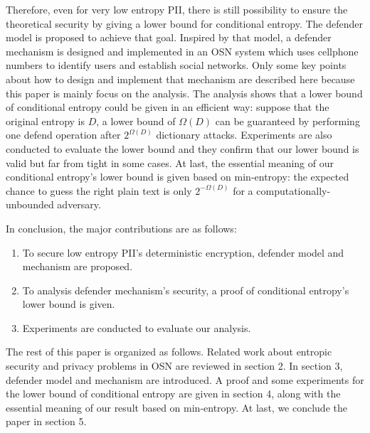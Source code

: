 \documentclass[10pt, conference, compsocconf]{IEEEtran}
\begin{document}
	Therefore, even for very low entropy PII, 
	there is still possibility to ensure the
	theoretical security by giving a lower bound for conditional entropy.
	The defender model is proposed to achieve that goal.
	Inspired by that model, a defender mechanism is designed and implemented
	in an OSN system which uses cellphone numbers
	to identify users and establish social networks.
	Only some key points about how to design and implement that mechanism
	are described here because this paper is mainly focus on the analysis.
	The analysis shows that a lower bound 
	of conditional entropy could be given in an efficient way: suppose that the original entropy
	is $D$, a lower bound of $\Omega(D)$ can be guaranteed
	by performing one defend operation after $2^{\Omega(D)}$ 
	dictionary attacks.
	Experiments are also conducted to evaluate the lower bound and they confirm that
	our lower bound is valid but far from tight in some cases. At last, the essential
	meaning of our conditional entropy's lower bound is given based on min-entropy: 
	the expected chance to guess the right plain text is only $2^{-\Omega(D)}$ for
	a computationally-unbounded adversary.
	
	In conclusion, the major contributions are as follows: 
	\begin{enumerate}
		\item To secure low entropy PII's deterministic encryption, 
		defender model and mechanism are proposed.
		\item To analysis defender mechanism's security,
		a proof of conditional entropy's lower bound
		is given.
		\item Experiments
		are conducted to evaluate our analysis.
	\end{enumerate}
	
	The rest of this paper is organized as follows.
	Related work about entropic security
	and privacy problems in OSN are reviewed in section 2. In
	section 3, defender model and mechanism are introduced. 
	A proof and some experiments for the
	lower bound of conditional entropy are given in section 4, 
	along with the essential
	meaning of our result based on min-entropy. 
	At last, we conclude the paper in section 5.	
	
	
\end{document}
